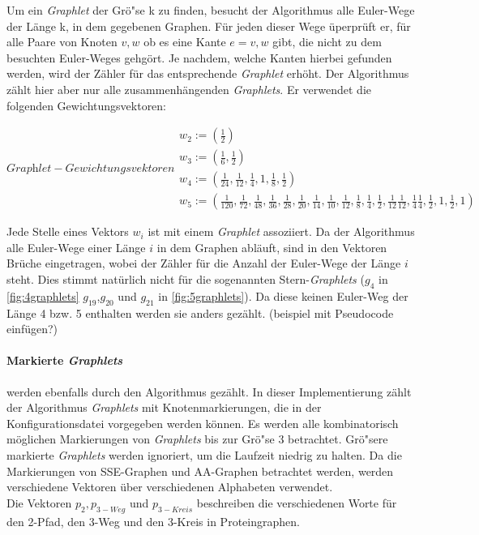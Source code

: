 \documentclass{report}
\begin{document}
Um ein \textit{Graphlet} der Gr\"o"se k zu finden, besucht der Algorithmus alle Euler-Wege der L\"ange k, in dem gegebenen Graphen. F\"ur jeden dieser Wege \"uperpr\"uft er, f\"ur alle Paare von Knoten $v,w$ ob es eine Kante $e = {v,w}$ gibt, die nicht zu dem besuchten Euler-Weges gehg\"ort. Je nachdem, welche Kanten hierbei gefunden werden, wird der Z\"ahler f\"ur das entsprechende \textit{Graphlet} erh\"oht. Der Algorithmus z\"ahlt hier aber nur alle zusammenh\"angenden \textit{Graphlets}. Er verwendet die folgenden Gewichtungsvektoren: 


\begin{subequations}
\label{eq:w-vector}
\textit{Graphlet}-Gewichtungsvektoren
\begin{align}
w_2 := \left( \frac{1}{2} \right) \\
w_3 := \left( \frac{1}{6}, \frac{1}{2} \right) \\
w_4 := \left( \frac{1}{24}, \frac{1}{12}, \frac{1}{4}, 1, \frac{1}{8},\frac{1}{2} \right) \\
w_5 := \left( \frac{1}{120}, \frac{1}{72}, \frac{1}{48}, \frac{1}{36}, \frac{1}{28}, \frac{1}{20}, \frac{1}{14}, \frac{1}{10}, \frac{1}{12}, \frac{1}{8}, \frac{1}{4}, \frac{1}{2}, \frac{1}{12} \frac{1}{12}, \frac{1}{4} \frac{1}{4}, \frac{1}{2}, 1, \frac{1}{2}, 1\right)
\end{align}
\end{subequations}

Jede Stelle eines Vektors $w_i$ ist mit einem \textit{Graphlet} assoziiert. Da der Algorithmus alle Euler-Wege einer L\"ange $i$ in dem Graphen abl\"auft, sind in den Vektoren Br\"uche eingetragen, wobei der Z\"ahler f\"ur die Anzahl der Euler-Wege der L\"ange $i$ steht. Dies stimmt nat\"urlich nicht f\"ur die sogenannten Stern-\textit{Graphlets} ($g_4$ in \ref{fig:4graphlets} $g_{19}$,$g_{20}$ und $g_{21}$ in \ref{fig:5graphlets}). Da diese keinen Euler-Weg der L\"ange 4 bzw. 5 enthalten werden sie anders gez\"ahlt.
(beispiel mit Pseudocode einf\"ugen?)

\paragraph{Markierte \textit{Graphlets}}
werden ebenfalls durch den Algorithmus gez\"ahlt. In dieser Implementierung z\"ahlt der Algorithmus \textit{Graphlets} mit Knotenmarkierungen, die in der Konfigurationsdatei vorgegeben werden k\"onnen.
 Es werden alle kombinatorisch m\"oglichen Markierungen von \textit{Graphlets} bis zur Gr\"o"se 3 betrachtet.
 Gr\"o"sere markierte \textit{Graphlets} werden ignoriert, um die Laufzeit niedrig zu halten.
Da die Markierungen von SSE-Graphen und AA-Graphen betrachtet werden, werden verschiedene Vektoren \"uber verschiedenen Alphabeten verwendet.\\
Die Vektoren $p_2, p_{3-Weg}$ und $p_{3-Kreis}$ beschreiben die verschiedenen Worte f\"ur den 2-Pfad, den 3-Weg und den 3-Kreis in Proteingraphen.
\end{document}
